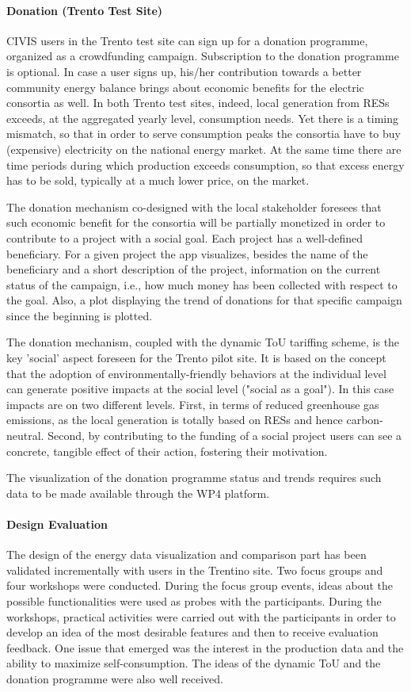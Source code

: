 \paragraph{Donation (Trento Test Site)}
CIVIS users in the Trento test site can sign up for a donation programme, organized as a crowdfunding campaign. Subscription to the donation programme is optional. In case a user signs up, his/her contribution towards a better community energy balance brings about economic benefits for the electric consortia as well. In both Trento test sites, indeed, local generation from RESs exceeds, at the aggregated yearly level, consumption needs. Yet there is a timing mismatch, so that in order to serve consumption peaks the consortia have to buy (expensive) electricity on the national energy market. At the same time there are time periods during which production exceeds consumption, so that excess energy has to be sold, typically at a much lower price, on the market.

The donation mechanism co-designed with the local stakeholder foresees that such economic benefit for the consortia will be partially monetized in order to contribute to a project with a social goal. Each project has a well-defined beneficiary. For a given project the app visualizes, besides the name of the beneficiary and a short description of the project, information on the current status of the campaign, i.e., how much money has been collected with respect to the goal. Also, a plot displaying the trend of donations for that specific campaign since the beginning is plotted.

The donation mechanism, coupled with the dynamic ToU tariffing scheme, is the key 'social' aspect foreseen for the Trento pilot site. It is based on the concept that the adoption of environmentally-friendly behaviors at the individual level can generate positive impacts at the social level ("social as a goal"). In this case impacts are on two different levels. First, in terms of reduced greenhouse gas emissions, as the local generation is totally based on RESs and hence carbon-neutral. Second, by contributing to the funding of a social project users can see a concrete, tangible effect of their action, fostering their motivation. 

The visualization of the donation programme status and trends requires such data to be made available through the WP4 platform.

\paragraph{Design Evaluation}
The design of the energy data visualization and comparison part has been validated incrementally with users in the Trentino site. Two focus groups and four workshops were conducted. During the focus group events, ideas about the possible functionalities were used as probes with the participants. During the workshops, practical activities were carried out with the participants in order to develop an idea of the most desirable features and then to receive evaluation feedback.
% 
One issue that emerged was the interest in the production data and the ability to maximize self-consumption. The ideas of the dynamic ToU and the donation programme were also well received. 

